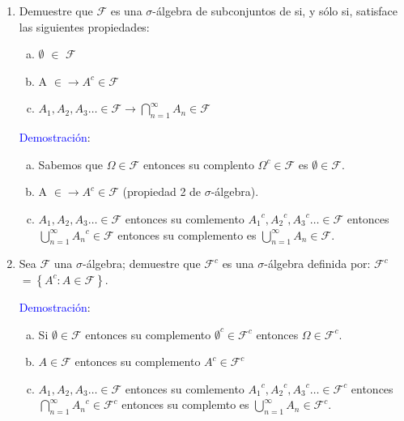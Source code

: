 \documentclass[a4paper, 12pt]{article}
\begin{document}
\newpage
\begin{enumerate}
\item Demuestre que $\mathcal{F}$ es una $\sigma$-\'algebra de subconjuntos de si, y s\'olo si, satisface las siguientes propiedades:

\begin{enumerate}[a.]
   \item $\emptyset$ $\in$ $\mathcal{F}$
   \item A $\in \longrightarrow A^c \in \mathcal{F}$
   \item $A_1,A_2,A_3 \ldots \in \mathcal{F} \longrightarrow \bigcap_{n=1}^{\infty}A_n \in \mathcal{F} $\\
 \end{enumerate}  
  
\textcolor{blue}{Demostraci\'on}:
   
\begin{enumerate}[a.]
  \item Sabemos que $\Omega \in \mathcal{F}$ entonces su complento ${\Omega}^c \in \mathcal{F} $ es $\emptyset \in \mathcal{F}$.
  \item A $\in \longrightarrow A^c \in \mathcal{F}$ (propiedad 2 de $\sigma$-\'algebra).
  \item  $A_1,A_2,A_3 \ldots \in \mathcal{F}$ entonces su comlemento ${A_1}^c,{A_2}^c,{A_3}^c \ldots \in \mathcal{F}$ entonces $\bigcup_{n=1}^{\infty}{A_n}^c \in \mathcal{F} $ entonces su complemento es $\bigcup_{n=1}^{\infty}A_n \in \mathcal{F}$.
\end{enumerate}
\item Sea $\mathcal{F}$ una $\sigma$-\'algebra; demuestre que ${\mathcal{F}}^c$ es una $\sigma$-\'algebra definida por: $\mathcal{F}^c$ $= \left\lbrace A^c :A \in  \mathcal{F} \right\rbrace$.

\textcolor{blue}{ Demostraci\'on}:
\begin{enumerate}[a.]
\item Si $\emptyset \in \mathcal{F}$ entonces su complemento ${\emptyset}^c \in {\mathcal{F}}^c $ entonces $\Omega \in {\mathcal{F}}^c$.
\item $A\in \mathcal{F}$ entonces su complemento ${A}^c\in {\mathcal{F}}^c$
\item  $A_1,A_2,A_3 \ldots \in \mathcal{F}$ entonces su comlemento  ${A_1}^c,{A_2}^c,{A_3}^c \ldots \in {\mathcal{F}}^c$ entonces $\bigcap_{n=1}^{\infty}{A_n}^c \in {\mathcal{F}}^c$  entonces su complemto es $\displaystyle\bigcup_{n=1}^{\infty}{A_n} \in {\mathcal{F}}^c$.
\end{enumerate}


\end{enumerate}
\end{document}
